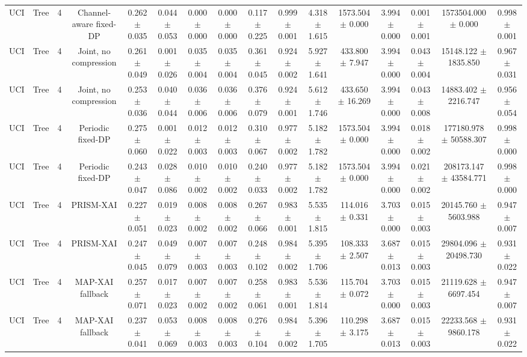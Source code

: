 \begin{tabular}{lccccccccccccccc}
UCI & Tree & 4 & Channel-aware fixed-DP & 0.262 $\pm$ 0.035 & 0.044 $\pm$ 0.053 & 0.000 $\pm$ 0.000 & 0.000 $\pm$ 0.000 & 0.117 $\pm$ 0.225 & 0.999 $\pm$ 0.001 & 4.318 $\pm$ 1.615 & 1573.504 $\pm$ 0.000 & 3.994 $\pm$ 0.000 & 0.001 $\pm$ 0.001 & 1573504.000 $\pm$ 0.000 & 0.998 $\pm$ 0.001 \\
UCI & Tree & 4 & Joint, no compression & 0.261 $\pm$ 0.049 & 0.001 $\pm$ 0.026 & 0.035 $\pm$ 0.004 & 0.035 $\pm$ 0.004 & 0.361 $\pm$ 0.045 & 0.924 $\pm$ 0.002 & 5.927 $\pm$ 1.641 & 433.800 $\pm$ 7.947 & 3.994 $\pm$ 0.000 & 0.043 $\pm$ 0.004 & 15148.122 $\pm$ 1835.850 & 0.967 $\pm$ 0.031 \\
UCI & Tree & 4 & Joint, no compression & 0.253 $\pm$ 0.036 & 0.040 $\pm$ 0.044 & 0.036 $\pm$ 0.006 & 0.036 $\pm$ 0.006 & 0.376 $\pm$ 0.079 & 0.924 $\pm$ 0.001 & 5.612 $\pm$ 1.746 & 433.650 $\pm$ 16.269 & 3.994 $\pm$ 0.000 & 0.043 $\pm$ 0.008 & 14883.402 $\pm$ 2216.747 & 0.956 $\pm$ 0.054 \\
UCI & Tree & 4 & Periodic fixed-DP & 0.275 $\pm$ 0.060 & 0.001 $\pm$ 0.022 & 0.012 $\pm$ 0.003 & 0.012 $\pm$ 0.003 & 0.310 $\pm$ 0.067 & 0.977 $\pm$ 0.002 & 5.182 $\pm$ 1.782 & 1573.504 $\pm$ 0.000 & 3.994 $\pm$ 0.000 & 0.018 $\pm$ 0.002 & 177180.978 $\pm$ 50588.307 & 0.998 $\pm$ 0.000 \\
UCI & Tree & 4 & Periodic fixed-DP & 0.243 $\pm$ 0.047 & 0.028 $\pm$ 0.086 & 0.010 $\pm$ 0.002 & 0.010 $\pm$ 0.002 & 0.240 $\pm$ 0.033 & 0.977 $\pm$ 0.002 & 5.182 $\pm$ 1.782 & 1573.504 $\pm$ 0.000 & 3.994 $\pm$ 0.000 & 0.021 $\pm$ 0.002 & 208173.147 $\pm$ 43584.771 & 0.998 $\pm$ 0.000 \\
UCI & Tree & 4 & PRISM-XAI & 0.227 $\pm$ 0.051 & 0.019 $\pm$ 0.023 & 0.008 $\pm$ 0.002 & 0.008 $\pm$ 0.002 & 0.267 $\pm$ 0.066 & 0.983 $\pm$ 0.001 & 5.535 $\pm$ 1.815 & 114.016 $\pm$ 0.331 & 3.703 $\pm$ 0.000 & 0.015 $\pm$ 0.003 & 20145.760 $\pm$ 5603.988 & 0.947 $\pm$ 0.007 \\
UCI & Tree & 4 & PRISM-XAI & 0.247 $\pm$ 0.045 & 0.049 $\pm$ 0.079 & 0.007 $\pm$ 0.003 & 0.007 $\pm$ 0.003 & 0.248 $\pm$ 0.102 & 0.984 $\pm$ 0.002 & 5.395 $\pm$ 1.706 & 108.333 $\pm$ 2.507 & 3.687 $\pm$ 0.013 & 0.015 $\pm$ 0.003 & 29804.096 $\pm$ 20498.730 & 0.931 $\pm$ 0.022 \\
UCI & Tree & 4 & MAP-XAI fallback & 0.257 $\pm$ 0.071 & 0.017 $\pm$ 0.023 & 0.007 $\pm$ 0.002 & 0.007 $\pm$ 0.002 & 0.258 $\pm$ 0.061 & 0.983 $\pm$ 0.001 & 5.536 $\pm$ 1.814 & 115.704 $\pm$ 0.072 & 3.703 $\pm$ 0.000 & 0.015 $\pm$ 0.003 & 21119.628 $\pm$ 6697.454 & 0.947 $\pm$ 0.007 \\
UCI & Tree & 4 & MAP-XAI fallback & 0.237 $\pm$ 0.041 & 0.053 $\pm$ 0.069 & 0.008 $\pm$ 0.003 & 0.008 $\pm$ 0.003 & 0.276 $\pm$ 0.104 & 0.984 $\pm$ 0.002 & 5.396 $\pm$ 1.705 & 110.298 $\pm$ 3.175 & 3.687 $\pm$ 0.013 & 0.015 $\pm$ 0.003 & 22233.568 $\pm$ 9860.178 & 0.931 $\pm$ 0.022 \\
\bottomrule
\end{tabular}
